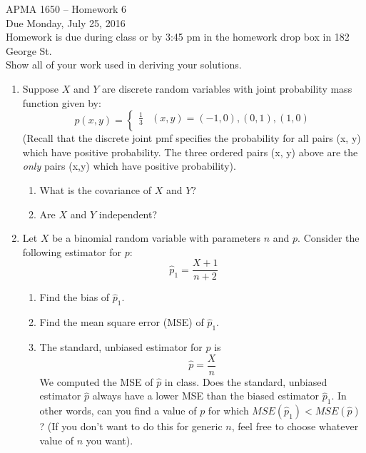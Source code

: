 \documentclass[12pt]{article}
\begin{document}
\title{}
\author{\vspace{-10ex} }

\begin{center}
{\LARGE APMA 1650 -- Homework 6}\\
\vspace{5mm}
{\large Due Monday, July 25, 2016}\\
\vspace{5mm}
Homework is due during class or by 3:45 pm in the homework drop box in 182 George St.\\
Show all of your work used in deriving your solutions.
\end{center}

\begin{enumerate}

\item Suppose $X$ and $Y$ are discrete random variables with joint probability mass function given by:
\[
p(x, y) = \begin{cases}
\frac{1}{3} & (x, y) = (-1, 0), (0, 1), (1, 0) \\
\end{cases}
\]
(Recall that the discrete joint pmf specifies the probability for all pairs (x, y) which have positive probability. The three ordered pairs (x, y) above are the \emph{only} pairs (x,y) which have positive probability).
\begin{enumerate}
\item What is the covariance of $X$ and $Y$?
\item Are $X$ and $Y$ independent?
\end{enumerate}

\item Let $X$ be a binomial random variable with parameters $n$ and $p$. Consider the following estimator for $p$:
\[
\hat{p}_1 = \frac{X+1}{n+2}
\]
\begin{enumerate}
\item Find the bias of $\hat{p}_1$.
\item Find the mean square error (MSE) of $\hat{p}_1$.
\item The standard, unbiased estimator for $p$ is 
\[
\hat{p} = \frac{X}{n}
\]
We computed the MSE of $\hat{p}$ in class. Does the standard, unbiased estimator $\hat{p}$ always have a lower MSE than the biased estimator $\hat{p}_1$. In other words, can you find a value of $p$ for which $MSE(\hat{p}_1) < MSE(\hat{p})$? (If you don't want to do this for generic $n$, feel free to choose whatever value of $n$ you want).
\end{enumerate}


\end{enumerate}
\end{document}

